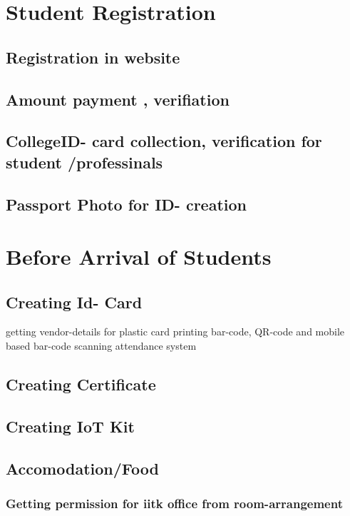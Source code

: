 \documentclass[11pt]{article}
\author{DK}
\date{\today}
\title{}
\begin{document}
\tableofcontents

\section{Student Registration}
\label{sec:org9eb070c}
\subsection{Registration in website}
\label{sec:org1f49564}
\subsection{Amount payment , verifiation}
\label{sec:org5bfadc5}
\subsection{CollegeID- card collection, verification for student /professinals}
\label{sec:org41d4f7b}
\subsection{Passport Photo for ID- creation}
\label{sec:org048667a}
\section{Before Arrival of Students}
\label{sec:org8f631d6}
\subsection{Creating Id- Card}
\label{sec:org2821c11}
getting vendor-details for plastic card printing
bar-code, QR-code and mobile based  bar-code scanning attendance system
\subsection{Creating Certificate}
\label{sec:org00e2db9}
\subsection{Creating IoT Kit}
\label{sec:orgc17cfca}
\subsection{Accomodation/Food}
\label{sec:orgb08dca3}
\subsubsection{Getting permission for iitk  office from room-arrangement}
\label{sec:orgb2a8b7d}
\end{document}
